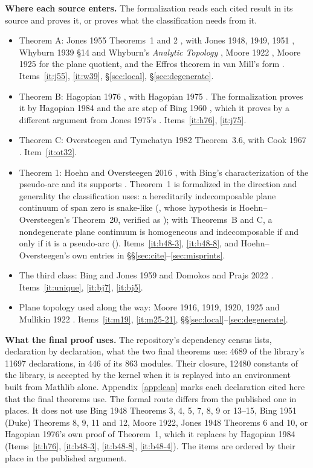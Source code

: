 \documentclass[11pt]{article}
\begin{document}
\textbf{Where each source enters.} The formalization reads each cited result in its source and
proves it, or proves what the classification needs from it.
\begin{itemize}
\item Theorem A: Jones 1955 Theorems~1 and 2 \cite{J55}, with Jones 1948, 1949, 1951
  \cite{J48,J49,J51}, Whyburn 1939 \S14 and Whyburn's \emph{Analytic Topology} \cite{W39,W42},
  Moore 1922 \cite{M22}, Moore 1925 \cite{M25} for the plane quotient, and the Effros theorem in
  van Mill's form \cite{vM04}. Items~\ref{it:j55}, \ref{it:w39}, \S\ref{sec:local},
  \S\ref{sec:degenerate}.
\item Theorem B: Hagopian 1976 \cite{H76}, with Hagopian 1975 \cite{H75}. The formalization
  proves it by Hagopian 1984 \cite{H84} and the arc step of Bing 1960 \cite{B60}, which it proves by
  a different argument from Jones 1975's \cite{J75}. Items~\ref{it:h76}, \ref{it:j75}.
\item Theorem C: Oversteegen and Tymchatyn 1982 Theorem~3.6, with Cook 1967 \cite{C67}.
  Item~\ref{it:ot32}.
\item Theorem 1: Hoehn and Oversteegen 2016 \cite{HO16}, with Bing's characterization of the
  pseudo-arc \cite{B48,B51a,B51b} and its supports \cite{L61,F66,F69,I68}. Theorem~1 is formalized
  in the direction and generality the classification uses: a hereditarily indecomposable plane
  continuum of span zero is snake-like (, whose hypothesis is
  Hoehn--Oversteegen's Theorem~20, verified as ); with Theorems~B and C, a
  nondegenerate plane continuum is homogeneous and indecomposable if and only if it is a pseudo-arc
  (). Items~\ref{it:b48-3}, \ref{it:b48-8}, and
  Hoehn--Oversteegen's own entries in \S\S\ref{sec:cite}--\ref{sec:misprints}.
\item The third class: Bing and Jones 1959 \cite{BJ59} and Domokos and Prajs 2022 \cite{DP22}.
  Items~\ref{it:unique}, \ref{it:bj7}, \ref{it:bj5}.
\item Plane topology used along the way: Moore 1916, 1919, 1920, 1925 \cite{M16,M19,M20,M25} and
  Mullikin 1922 \cite{Mu22}. Items~\ref{it:m19}, \ref{it:m25-21}, \S\S\ref{sec:local}--\ref{sec:degenerate}.
\end{itemize}
\textbf{What the final proof uses.} The repository's dependency census lists, declaration by
declaration, what the two final theorems use: 4689 of the library's 11697 declarations, in 446 of
its 863 modules. Their closure, 12480 constants of the library, is accepted by the kernel when it
is replayed into an environment built from Mathlib alone. Appendix~\ref{app:lean} marks each
declaration cited here that the final theorems use. The formal route differs from the published
one in places. It does not use Bing 1948 Theorems 3, 4, 5, 7, 8, 9 or 13--15, Bing 1951 (Duke) Theorems 8, 9,
11 and 12, Moore 1922, Jones 1948 Theorems 6 and 10, or Hagopian 1976's own proof of Theorem~1,
which it replaces by Hagopian 1984 (Items~\ref{it:h76}, \ref{it:b48-3}, \ref{it:b48-8},
\ref{it:b48-4}). The items are ordered by their place in the published argument.
\end{document}
